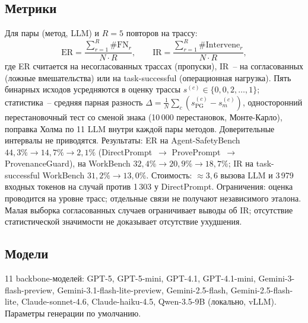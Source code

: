 \subsection{Метрики}
Для пары (метод, LLM) и $R=5$ повторов на трассу:
\begin{equation}
\mathrm{ER} = \frac{\sum_{r=1}^{R}\#\mathrm{FN}_r}{N\cdot R}, \qquad
\mathrm{IR} = \frac{\sum_{r=1}^{R}\#\mathrm{Intervene}_r}{N\cdot R},
\end{equation}
где ER считается на несогласованных трассах (пропуски), IR~-- на согласованных
(ложные вмешательства) или на task-successful (операционная нагрузка). Пять бинарных
исходов усредняются в оценку трассы $s^{(c)}\in\{0, 0{,}2,\dots,1\}$; статистика~-- средняя
парная разность $\Delta=\frac1N\sum_c (s^{(c)}_{\mathrm{PG}}-s^{(c)}_{m})$, односторонний
перестановочный тест со сменой знака (10\,000 перестановок, Монте-Карло), поправка
Холма по 11 LLM внутри каждой пары методов. Доверительные интервалы не приводятся.
Результаты: ER на Agent-SafetyBench $44{,}3\%\to14{,}7\%\to2{,}1\%$
(DirectPrompt~$\to$ ProvePrompt~$\to$ ProvenanceGuard), на WorkBench $32{,}4\%\to20{,}9\%\to18{,}7\%$;
IR на task-successful WorkBench $31{,}2\%\to13{,}0\%$. Стоимость: $\approx3{,}6$ вызова LLM
и 3\,979 входных токенов на случай против 1\,303 у DirectPrompt.
Ограничения: оценка проводится на уровне трасс; отдельные связи не получают
независимого эталона. Малая выборка согласованных случаев ограничивает выводы об IR;
отсутствие статистической значимости не доказывает отсутствие ухудшения.

\subsection{Модели}
11 backbone-моделей: GPT-5, GPT-5-mini, GPT-4.1, GPT-4.1-mini, Gemini-3-flash-preview,
Gemini-3.1-flash-lite-preview, Gemini-2.5-flash, Gemini-2.5-flash-lite, Claude-sonnet-4.6,
Claude-haiku-4.5, Qwen-3.5-9B (локально, vLLM). Параметры генерации по умолчанию.
